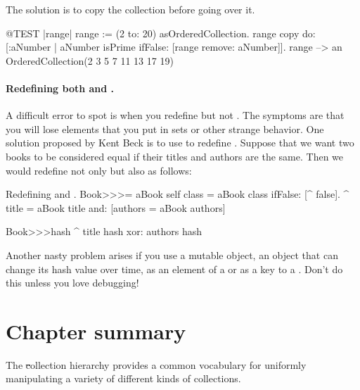 \documentclass[a4paper,10pt,twoside]{book}
\begin{document}
The solution is to copy the collection before going over it.
\begin{code}{@TEST |range|}
range := (2 to: 20) asOrderedCollection.
range copy do: [:aNumber | aNumber isPrime ifFalse: [range remove: aNumber]].
range --> an OrderedCollection(2 3 5 7 11 13 17 19)
\end{code}

\paragraph{Redefining both \ct{=} and .}
A difficult error to spot is when you redefine \ct{=} but not .
The symptoms are that you will lose elements that you put in sets or other strange behavior. 
One solution proposed by Kent Beck is to use  to redefine .
Suppose that we want two books to be considered equal if their titles and authors are the same.
Then we would redefine not only \ct{=} but also  as follows:

\begin{method}{Redefining \lct{=} and .}
Book>>>= aBook
   self class = aBook class ifFalse: [^ false].
   ^ title = aBook title and: [authors = aBook authors]

Book>>>hash 
   ^ title hash xor: authors hash
\end{method}

Another nasty problem arises if you use a mutable object, \ie an object that can change its hash value over time, as an element of a  or as a key to a .
Don't do this unless you love debugging!

\section{Chapter summary}

The \st collection hierarchy provides a common vocabulary for uniformly manipulating a variety of different kinds of collections.
\end{document}
